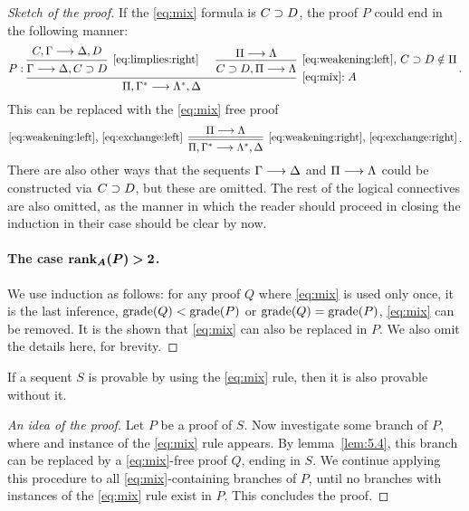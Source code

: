\documentclass[11pt,a4paper]{article}
\begin{document}
\begin{proof}[Sketch of the proof]
    If the \eqref{eq:mix} formula is \(C\supset D\),
    the proof \(P\) could end in the following manner:
    \begin{equation*}
        P:
        \begin{prooftree}
            \hypo{C,\Gamma\seq\Delta,D}
            \infer1[\eqref{eq:limplies:right}]{\Gamma\seq\Delta,C\limplies D}
            \hypo{\Pi\seq\Lambda}
            \infer1[\eqref{eq:weakening:left}, \(C\limplies D\notin\Pi\)]{C\limplies D,\Pi\seq\Lambda}
            \infer2[\eqref{eq:mix}\(:A\)]{\Pi,\Gamma^*\seq\Lambda^*,\Delta}
        \end{prooftree}\,.
    \end{equation*}
    This can be replaced with the \eqref{eq:mix} free proof
    \begin{equation*}
        \begin{prooftree}
            \hypo{\Pi\seq\Lambda}
            \infer[double, left label={\eqref{eq:weakening:left}, \eqref{eq:exchange:left}}]1[\eqref{eq:weakening:right}, \eqref{eq:exchange:right}]{\Pi,\Gamma^*\seq\Lambda^*,\Delta}
        \end{prooftree}\,.
    \end{equation*}
    There are also other ways that the sequents \(\Gamma\longrightarrow\Delta\) and
    \(\Pi\longrightarrow\Lambda\) could be constructed via \(C\supset D\),
    but these are omitted. The rest of the logical connectives are also
    omitted, as the manner in which the reader should proceed in
    closing the induction in their case should be clear by now.

    \paragraph{The case \(\bm{\rank_A(P) > 2}\).}
    We use induction as follows:
    for any proof \(Q\) where \eqref{eq:mix} is used only once,
    it is the last inference, \(\operatorname{grade}(Q) < \operatorname{grade}(P)\) or
    \(\operatorname{grade}(Q) = \operatorname{grade}(P)\), \eqref{eq:mix} can be removed.
    It is the shown that \eqref{eq:mix} can also be replaced in \(P\).
    We also omit the details here, for brevity.
\end{proof}

\begin{theorem}[Theorem 5.3]\label{the:5.3}
    If a sequent \(S\) is provable by using the \eqref{eq:mix} rule,
    then it is also provable without it.
\end{theorem}

\begin{proof}[An idea of the proof]
    Let \(P\) be a proof of \(S\).
    Now investigate some branch of \(P\),
    where and instance of the \eqref{eq:mix} rule appears.
    By lemma~\ref{lem:5.4}, this branch can be replaced by
    a \eqref{eq:mix}-free proof \(Q\), ending in \(S\).
    We continue applying this procedure to all
    \eqref{eq:mix}-containing branches of \(P\),
    until no branches with instances of the \eqref{eq:mix} rule
    exist in \(P\). This concludes the proof.
\end{proof}
\end{document}

